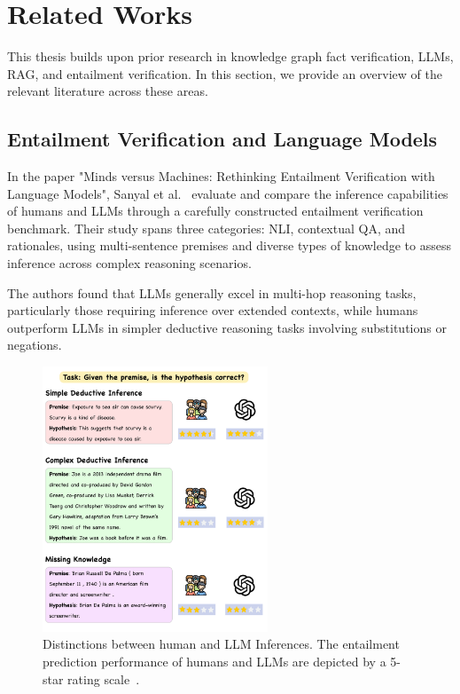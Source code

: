 \chapter{Related Works}\label{ch:related_works}
This thesis builds upon prior research in knowledge graph fact verification, \ac{LLMs}, \ac{RAG}, and entailment verification.
In this section, we provide an overview of the relevant literature across these areas.

\section{Entailment Verification and Language Models}\label{sec:entailment-verification}
In the paper "Minds versus Machines: Rethinking Entailment Verification with Language Models", Sanyal et al.~\cite{sanyal2024machinesbettercomplexreasoning} evaluate and compare the inference capabilities of humans and \ac{LLMs} through a carefully constructed entailment verification benchmark.
Their study spans three categories: \ac{NLI}, contextual \ac{QA}, and rationales, using multi-sentence premises and diverse types of knowledge to assess inference across complex reasoning scenarios.

The authors found that LLMs generally excel in multi-hop reasoning tasks, particularly those requiring inference over extended contexts, while humans outperform \ac{LLMs} in simpler deductive reasoning tasks involving substitutions or negations.

\begin{figure}[ht!]
    \centering
    \begin{minipage}[b]{\textwidth}
        \centering
        \includegraphics[width=0.6\textwidth]{res/rel-human-llm-inference}
    \end{minipage}
    \caption{Distinctions between human and LLM Inferences. The entailment prediction performance of humans and LLMs are depicted by a 5-star rating scale~\cite{sanyal2024machinesbettercomplexreasoning}.}
    \label{fig:distinguishing-human-llm-inferences}
\end{figure}

